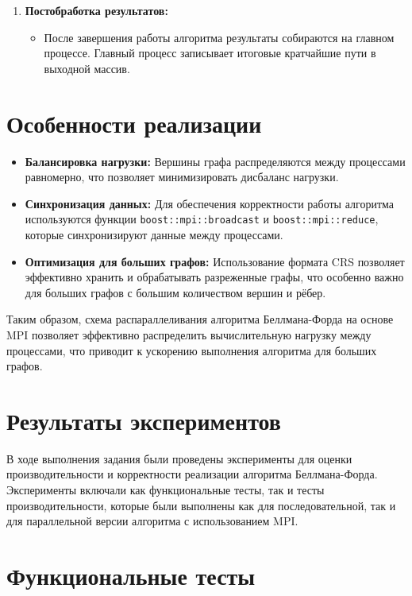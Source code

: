 \documentclass[12pt]{article}
\begin{document}
\begin{enumerate}[leftmargin=*,itemsep=5pt]
    \item \textbf{Постобработка результатов:}
    \begin{itemize}
        \item После завершения работы алгоритма результаты собираются на главном процессе. Главный процесс записывает итоговые кратчайшие пути в выходной массив.
    \end{itemize}
\end{enumerate}

\section*{Особенности реализации}

\begin{itemize}
    \item \textbf{Балансировка нагрузки:} Вершины графа распределяются между процессами равномерно, что позволяет минимизировать дисбаланс нагрузки.
    \item \textbf{Синхронизация данных:} Для обеспечения корректности работы алгоритма используются функции \texttt{boost::mpi::broadcast} и \texttt{boost::mpi::reduce}, которые синхронизируют данные между процессами.
    \item \textbf{Оптимизация для больших графов:} Использование формата CRS позволяет эффективно хранить и обрабатывать разреженные графы, что особенно важно для больших графов с большим количеством вершин и рёбер.
\end{itemize}

Таким образом, схема распараллеливания алгоритма Беллмана-Форда на основе MPI позволяет эффективно распределить вычислительную нагрузку между процессами, что приводит к ускорению выполнения алгоритма для больших графов.

\section*{Результаты экспериментов}

В ходе выполнения задания были проведены эксперименты для оценки производительности и корректности реализации алгоритма Беллмана-Форда. Эксперименты включали как функциональные тесты, так и тесты производительности, которые были выполнены как для последовательной, так и для параллельной версии алгоритма с использованием MPI.

\section*{Функциональные тесты}
\end{document}

